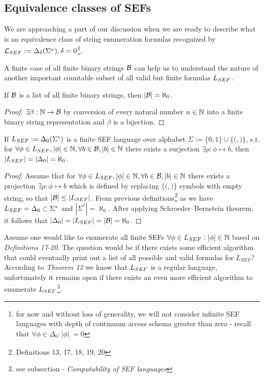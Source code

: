 \subsection{Equivalence classes of SEFs}\label{subsection_eqcls_of_sefs}

We are approaching a part of our discussion when we are ready to describe what is an equivalence class of string enumeration formulas recognized by $\mathcal{L}_{SEF} := \Delta_\delta(\Sigma^\omega), \delta = 0$\footnote{for now and without loss of generality, we will not consider infinite SEF languages with depth of continuum access schema greater than zero - recall that $\forall \phi \in \Delta_0: |\phi|_{:} = 0 $}.

A finite case of all finite binary strings $\mathcal{B}$ can help us to understand the nature of another important countable subset of all valid but finite formulas $L_{SEF}$.

\begin{lemma}
  If $\mathcal{B}$ is a list of all finite binary strings, then $|\mathcal{B}| = \aleph_0$.
\end{lemma}
\begin{proof}$\exists \beta: \mathbb{N} \to \mathcal{B}$ by conversion of every natural number $n \in \mathbb{N}$ into a finite binary string representation and $\beta$ is a bijection.\end{proof}

\begin{lemma}
  If $L_{SEF} := \Delta_0(\Sigma^*)$ is a finite SEF language over alphabet $\Sigma := \{0, 1\} \cup \{{(}, {)}\} $, s.t. for $\forall \phi \in L_{SEF}, |\phi| \in \mathbb{N}, \forall b \in \mathcal{B}, |b| \in \mathbb{N}$ there exists a surjection $ \exists \rho: \phi \mapsto b $, then $|L_{SEF}| = |\Delta_0| = \aleph_0$.
\end{lemma}
\begin{proof}Assume that for $\forall \phi \in L_{SEF}, |\phi| \in \mathbb{N}, \forall b \in \mathcal{B}, |b| \in \mathbb{N}$ there exists a projection $\exists \rho: \phi \mapsto b$  which is defined by replacing $\{{(}, {)}\}$ symbols with empty string, so that $|\mathcal{B}| \leq |L_{SEF}|$. From previous definitions\footnote{Definitions 13, 17, 18, 19, 20} as we have $L_{SEF} = \Delta_0 \subset \Sigma^*$ and $|\Sigma^*| = \aleph_0$. After applying Schroeder–Bernstein theorem, it follows that $|\Delta_0| = |L_{SEF}| = |\mathcal{B}| = \aleph_0$.\end{proof}

Assume one would like to enumerate all finite SEFs $\forall \phi \in L_{SEF}: |\phi| \in \mathbb{N}$ based on \textit{Definitions 17-20}. The question would be if there exists some efficient algorithm that could eventually print out a list of all possible and valid formulas for $L_{SEF}$? According to \textit{Theorem 12} we know that $L_{SEF}$ is a regular language, unfortunately it remains open if there exists an even more efficient algorithm to enumerate $L_{SEF}$\footnote{see subsection - \textit{Computability of SEF languages}}.

